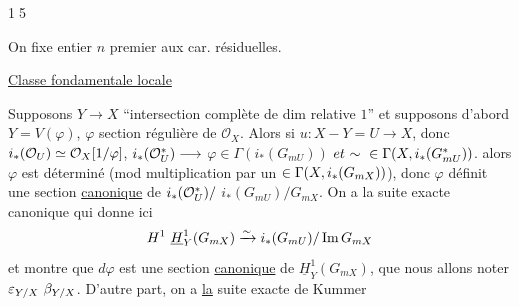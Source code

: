 
\textcircled{15}

On fixe entier $n$ premier aux
car. résiduelles.

\uline{Classe fondamentale locale}

Supposons $Y\longrightarrow X$ ``intersection complète de
dim relative $1$'' et supposons d'abord
$Y=V(\varphi)$, $\varphi$ section régulière de $\mathcal O_X$. Alors
si $u:X-Y=U\longrightarrow X$, donc
${i_*(\mathcal O_U)\simeq\mathcal O_X[1/\varphi]}$,
${i_*(\mathcal O_U^*)\longrightarrow}$
$\varphi\in\Gamma(i_*(G_{mU}))$
$\deleted{\unsure{et}\ \unsure{\sim}\ \in\Gamma(\unsure{X,i_*(G_{mU}^*)})}$.
 alors $\varphi$ est déterminé 
(mod multiplication
par un $\in\Gamma(X,{i_*}(G_{mX}))$), donc  $\varphi$ définit
une section \deleted{$\varphi\in$} \uline{canonique} de
${i_*(\mathcal O_U^*)/}$
$i_*(G_{mU})/G_{mX}$. On a la suite exacte
canonique
qui donne ici
\[
{{H^1}}\ \underline H_Y^1(G_{mX})
\xrightarrow{\sim}i_*(G_{mU})/\operatorname{Im}G_{mX}
\]
et montre que $d\varphi$ est une section
\uline{canonique} de $\underline H_Y^1(G_{mX})$, que nous allons
noter $\deleted{\unsure{\varepsilon_{Y/X}}}\ \unsure{\beta_{Y/X}}$.
D'autre part,
on a \uline{la} suite exacte de Kummer


